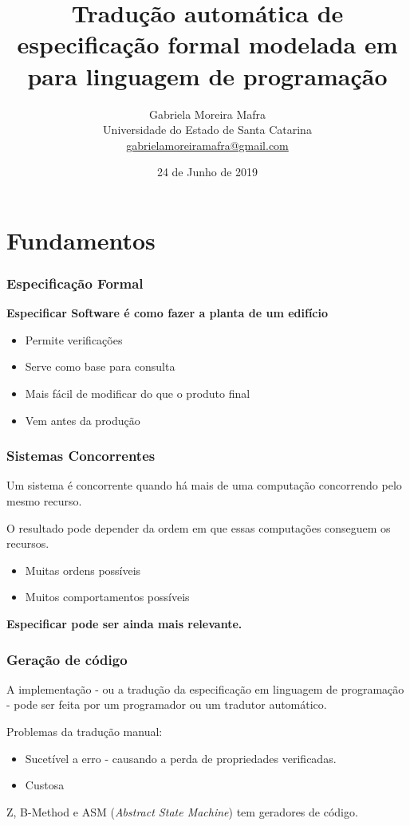 \documentclass{beamer}
\title[De \TLA para linguagem de programação]{Tradução automática de especificação formal modelada em \TLA para linguagem de programação}
\author[Gabriela M. Mafra]{
    Gabriela Moreira Mafra\\\smallskip
    {\scriptsize Universidade do Estado de Santa Catarina \\\smallskip
    \vspace{-2mm}
    \url{gabrielamoreiramafra@gmail.com}}
}
\begin{document}
  \date{24 de Junho de 2019}
  \begin{frame}
      \titlepage
  \end{frame}

\tableofcontents

\section{Fundamentos}

\begin{frame}
  \frametitle{Especificação Formal}

  \textbf{Especificar Software é como fazer a planta de um edifício}
  \begin{itemize}
    \item Permite verificações
    \item Serve como base para consulta
    \item Mais fácil de modificar do que o produto final
    \item Vem antes da produção
  \end{itemize}

\end{frame}

\begin{frame}
  \frametitle{Sistemas Concorrentes}

  Um sistema é concorrente quando há mais de uma computação concorrendo pelo mesmo recurso.\medskip

  O resultado pode depender da ordem em que essas computações conseguem os recursos.
  \begin{itemize}
    \item Muitas ordens possíveis
    \item Muitos comportamentos possíveis
  \end{itemize}

  \medskip\textbf{Especificar pode ser ainda mais relevante.}

\end{frame}

\begin{frame}
  \frametitle{Geração de código}

  A implementação - ou a tradução da especificação em linguagem de programação - pode ser feita por um programador ou um tradutor automático.\medskip

  Problemas da tradução manual:
  \begin{itemize}
    \item Sucetível a erro - causando a perda de propriedades verificadas.
    \item Custosa
  \end{itemize}\medskip

  Z, B-Method e ASM (\textit{Abstract State Machine}) tem geradores de código.\medskip

\end{frame}
\end{document}
